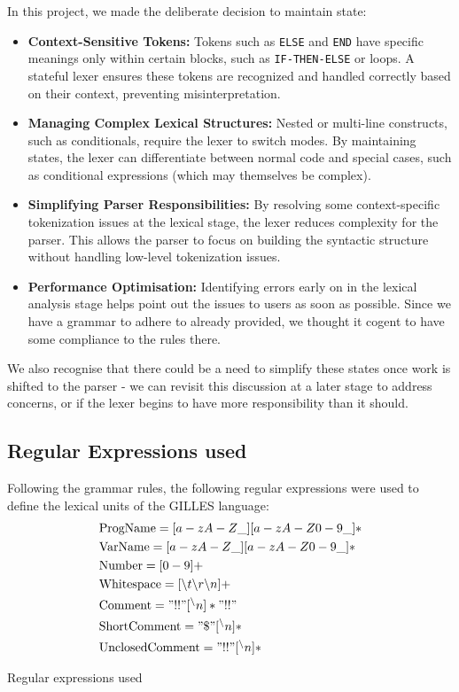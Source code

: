 In this project, we made the deliberate decision to maintain state:

\begin{itemize}
    \item \textbf{Context-Sensitive Tokens:} Tokens such as \texttt{ELSE} and \texttt{END} have specific meanings only within certain blocks, such as \texttt{IF-THEN-ELSE} or loops. A stateful lexer ensures these tokens are recognized and handled correctly based on their context, preventing misinterpretation.
    
    \item \textbf{Managing Complex Lexical Structures:} Nested or multi-line constructs, such as conditionals, require the lexer to switch modes. By maintaining states, the lexer can differentiate between normal code and special cases, such as conditional expressions (which may themselves be complex).
    
    \item \textbf{Simplifying Parser Responsibilities:} By resolving some context-specific tokenization issues at the lexical stage, the lexer reduces complexity for the parser. This allows the parser to focus on building the syntactic structure without handling low-level tokenization issues.

    \item \textbf{Performance Optimisation:} Identifying errors early on in the lexical analysis stage helps point out the issues to users as soon as possible. Since we have a grammar to adhere to already provided, we thought it cogent to have some compliance to the rules there.
\end{itemize}

We also recognise that there could be a need to simplify these states once work is shifted to the parser - we can revisit this discussion at a later stage to address concerns, or if the lexer begins to have more responsibility than it should.


	\subsection{Regular Expressions used}
	Following the grammar rules, the following regular expressions were used to define the lexical units of the GILLES language:
	\begin{align*}
		&\text{ProgName}     = [a-zA-Z\_][a-zA-Z0-9\_]* \\
		&\text{VarName}      = [a-zA-Z\_][a-zA-Z0-9\_]* \\
		&\text{Number}       = [0-9]+ \\
		&\text{Whitespace}   = [ \text{\textbackslash} t\text{\textbackslash} r\text{\textbackslash} n]+ \\
		&\text{Comment}      = "!!"[^\text{\textbackslash} n]*"!!" \\
		&\text{ShortComment} = "\$"[^\text{\textbackslash} n]* \\
  &\text{UnclosedComment}      = "!!"[^\text{\textbackslash} n]*\\
	\end{align*}
    \begin{table}[h]
		\centering
		\caption{Regular expressions used}
	\end{table}

